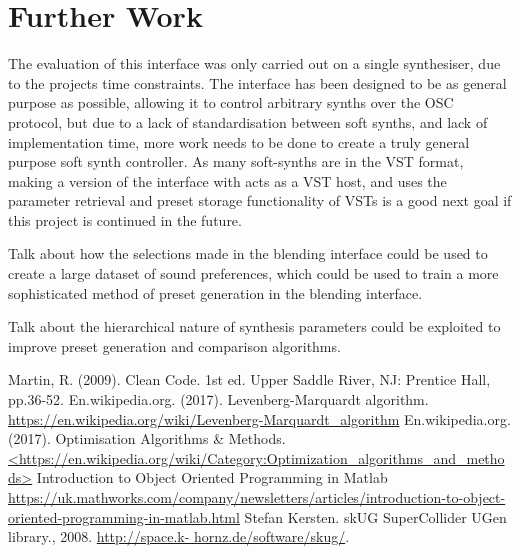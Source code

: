 \documentclass[11pt, oneside]{report}   	%
\begin{document}
\section{Further Work}
The evaluation of this interface was only carried out on a single synthesiser, due to the projects time constraints. The interface has been designed to be as general purpose as possible, allowing it to control arbitrary synths over the OSC protocol, but due to a lack of standardisation between soft synths, and lack of implementation time, more work needs to be done to create a truly general purpose soft synth controller. As many soft-synths are in the VST format, making a version of the interface with acts as a VST host, and uses the parameter retrieval and preset storage functionality of VSTs is a good next goal if this project is continued in the future.

Talk about how the selections made in the blending interface could be used to create a large dataset of sound preferences, which could be used to train a more sophisticated method of preset generation in the blending interface.

Talk about the hierarchical nature of synthesis parameters could be exploited to improve preset generation and comparison algorithms. 
\begin{thebibliography}{9}
\singlespacing
{}
Martin, R. (2009). Clean Code. 1st ed. Upper Saddle River, NJ: Prentice Hall, pp.36-52.
En.wikipedia.org. (2017). Levenberg-Marquardt algorithm. \\
\url{https://en.wikipedia.org/wiki/Levenberg-Marquardt_algorithm}
En.wikipedia.org. (2017). Optimisation Algorithms \& Methods.
\url{<https://en.wikipedia.org/wiki/Category:Optimization_algorithms_and_methods>}
Introduction to Object Oriented Programming in Matlab\\
\url{https://uk.mathworks.com/company/newsletters/articles/introduction-to-object-oriented-programming-in-matlab.html}
Stefan Kersten. skUG SuperCollider UGen library., 2008. \url{http://space.k- hornz.de/software/skug/}.
\end{thebibliography}
\end{document}
